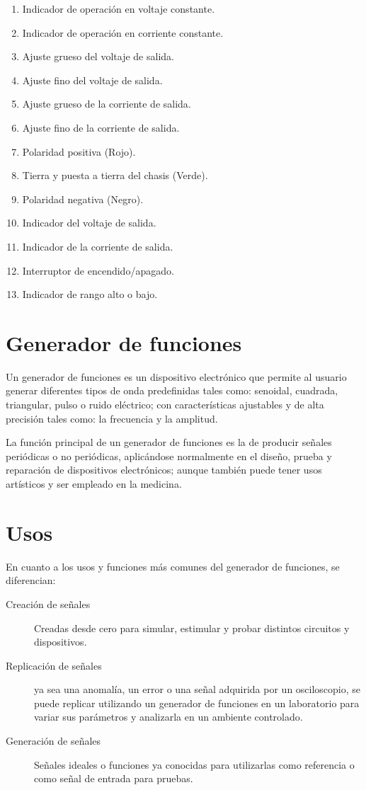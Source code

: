 \documentclass[letter,twoside,11pt]{article}
\begin{document}
\begin{enumerate}
    \item Indicador de operación en voltaje constante.
    \item Indicador de operación en corriente constante.
    \item Ajuste grueso del voltaje de salida.
    \item Ajuste fino del voltaje de salida.
    \item Ajuste grueso de la corriente de salida.
    \item Ajuste fino de la corriente de salida.
    \item Polaridad positiva (Rojo).
    \item Tierra y puesta a tierra del chasis (Verde).
    \item Polaridad negativa (Negro).
    \item Indicador del voltaje de salida.
    \item Indicador de la corriente de salida.
        \setcounter{enumi}{12}
    \item Interruptor de encendido/apagado.
    \item Indicador de rango alto o bajo.
\end{enumerate}

\section{Generador de funciones}
Un generador de funciones es un dispositivo electrónico que permite al usuario
generar diferentes tipos de onda predefinidas tales como: senoidal, cuadrada,
triangular, pulso o ruido eléctrico; con características ajustables y de alta
precisión tales como: la frecuencia y la amplitud.

La función principal de un generador de funciones es la de producir señales
periódicas o no periódicas, aplicándose normalmente en el diseño, prueba y
reparación de dispositivos electrónicos; aunque también puede tener usos
artísticos y ser empleado en la medicina.

\section{Usos}
En cuanto a los usos y funciones más comunes del generador de funciones, se
diferencian:

\begin{description}
    \item [Creación de señales] Creadas desde cero para simular, estimular y
    probar distintos circuitos y dispositivos.
    \item [Replicación de señales] ya sea una anomalía, un error o una señal
    adquirida por un osciloscopio, se puede replicar utilizando un generador de
    funciones en un laboratorio para variar sus parámetros y analizarla en un
    ambiente controlado.
    \item [Generación de señales] Señales ideales o funciones ya conocidas para
    utilizarlas como referencia o como señal de entrada para pruebas.
\end{description}
\end{document}
